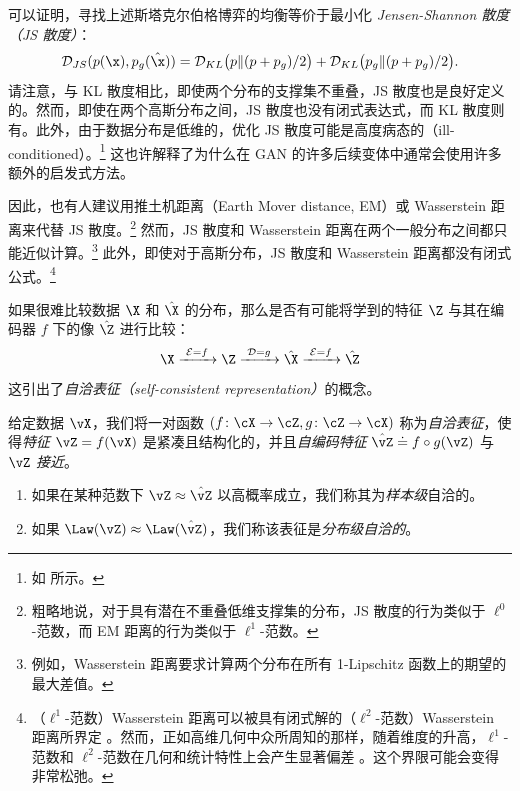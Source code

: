 \documentclass[../../book-main_zh.tex]{subfiles}
\begin{document}
可以证明，寻找上述斯塔克尔伯格博弈的均衡等价于最小化 {\em Jensen-Shannon 散度（JS 散度）}：
\begin{equation}
    \mathcal{D}_{JS}(p(\x), p_g(\hat \x)) = \mathcal{D}_{KL}\big(p \|
    (p + p_g)/{2}\big) + \mathcal{D}_{KL}\big(p_g \| (p + p_g)/{2}\big).
\end{equation}
请注意，与 KL 散度相比，即使两个分布的支撑集不重叠，JS 散度也是良好定义的。然而，即使在两个高斯分布之间，JS 散度也没有闭式表达式，而 KL 散度则有。此外，由于数据分布是低维的，优化 JS 散度可能是高度病态的（ill-conditioned）。\footnote{如 \cite{arjovsky2017wasserstein} 所示。} 这也许解释了为什么在 GAN 的许多后续变体中通常会使用许多额外的启发式方法。

因此，也有人建议用推土机距离（Earth Mover distance, EM）或 Wasserstein 距离来代替 JS 散度。\footnote{粗略地说，对于具有潜在不重叠低维支撑集的分布，JS 散度的行为类似于 $\ell^0$-范数，而 EM 距离的行为类似于 $\ell^1$-范数。} 然而，JS 散度和 Wasserstein 距离在两个一般分布之间都只能近似计算。\footnote{例如，Wasserstein 距离要求计算两个分布在所有 1-Lipschitz 函数上的期望的最大差值。} 此外，即使对于高斯分布，JS 散度和 Wasserstein 距离都没有闭式公式。\footnote{（$\ell^1$-范数）Wasserstein 距离可以被具有闭式解的（$\ell^2$-范数）Wasserstein 距离所界定 \cite{salmona2021gromovwasserstein}。然而，正如高维几何中众所周知的那样，随着维度的升高，$\ell^1$-范数和 $\ell^2$-范数在几何和统计特性上会产生显著偏差 \cite{Wright-Ma-2022}。这个界限可能会变得非常松弛。}

如果很难比较数据 $\X$ 和 $\hat \X$ 的分布，那么是否有可能将学到的特征 $\Z$ 与其在编码器 $f$ 下的像 $\hat \Z$ 进行比较：
\begin{equation}
    \X
    \xrightarrow{\hspace{1mm} \mathcal{E} = f \hspace{1mm}} \Z
    \xrightarrow{\hspace{1mm} \mathcal{D} = g \hspace{1mm}} \hat{\X}
    \xrightarrow{\hspace{1mm} \mathcal{E} = f \hspace{1mm}} \hat \Z
    \label{eqn:closed-autoencoding}
\end{equation}
这引出了{\em 自洽表征（self-consistent representation）}的概念。
\begin{definition}[自洽表征]\label{def:closed_loop}
    给定数据 \(\vX\)，我们将一对函数 \((f \colon \cX \to \cZ, g
    \colon \cZ \to \cX)\) 称为\textit{自洽表征}，使得\textit{特征} \(\vZ =
    f(\vX)\) 是紧凑且结构化的，并且\textit{自编码特征} \(\hat{\vZ} \doteq f \circ g(\vZ)\) 与 \(\vZ\) \textit{接近}。
    \begin{enumerate}
        \item 如果在某种范数下 \(\vZ \approx \hat{\vZ}\) 以高概率成立，我们称其为\textit{样本级}自洽的。
        \item 如果 \(\Law(\vZ) \approx \Law(\hat{\vZ})\)，我们称该表征是\textit{分布级自洽的}。
    \end{enumerate}
\end{definition}
\end{document}
